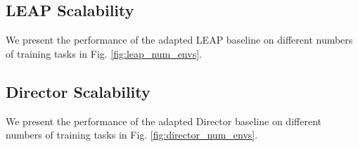 \subsection{LEAP Scalability}
We present the performance of the adapted LEAP baseline on different numbers of training tasks in Fig. \ref{fig:leap_num_envs}.

\begin{figure*}[htbp]
\centering
\hfill
{}
\hfill
{}
\hfill
{}
\hfill
{}

\caption{\small \textbf{Generalization Performance of the LEAP baseline on different numbers of training tasks}: each error bar (95\% confidence interval) is obtained from $20$ independent seed runs.}
\label{fig:leap_num_envs}
\end{figure*}

\subsection{Director Scalability}
We present the performance of the adapted Director baseline on different numbers of training tasks in Fig. \ref{fig:director_num_envs}.

\begin{figure*}[htbp]
\centering
\hfill
{}
\hfill
{}
\hfill
{}
\hfill
{}

\caption{\small \textbf{Generalization Performance of the Director baseline on different numbers of training tasks}: each error bar (95\% confidence interval) is obtained from $20$ independent seed runs.}
\label{fig:director_num_envs}
\end{figure*}

